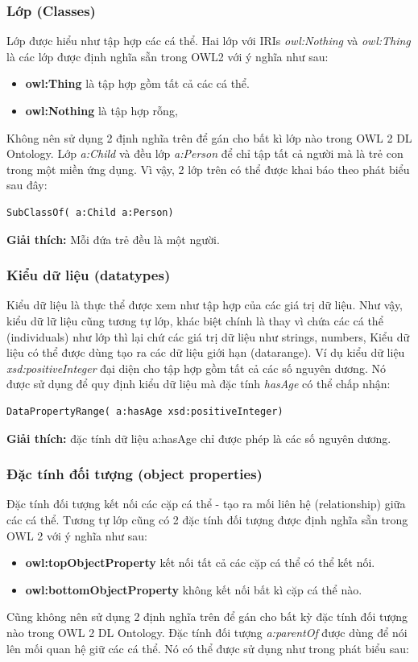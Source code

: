 \subsubsection{Lớp (Classes)}
Lớp được hiểu như tập hợp các cá thể. Hai lớp với IRIs \textit{owl:Nothing} và \textit{owl:Thing} là các lớp được định nghĩa sẵn trong OWL2 với ý nghĩa như sau:
\begin{itemize}
\item \textbf{owl:Thing} là tập hợp gồm tất cả các cá thể.
\item \textbf{owl:Nothing} là tập hợp rỗng,
\end{itemize}
Không nên sử dụng 2 định nghĩa trên để gán cho bất kì lớp nào trong OWL 2 DL Ontology. Lớp \textit{a:Child} và đều lớp \textit{a:Person} để chỉ tập tất cả người mà là trẻ con trong một miền ứng dụng. Vì vậy, 2 lớp trên có thể được khai báo theo phát biểu sau đây:

\begin{verbatim}
SubClassOf( a:Child a:Person) 
\end{verbatim}

\textbf{Giải thích:} Mỗi đứa trẻ đều là một người.

\subsubsection{Kiểu dữ liệu (datatypes)}
Kiểu dữ liệu là thực thể được xem như tập hợp của các giá trị dữ liệu. Như vậy, kiểu dữ lữ liệu cũng tương tự lớp, khác biệt chính là thay vì chứa các cá thể (individuals) như lớp thì lại chứ các giá trị dữ liệu như strings, numbers, Kiểu dữ liệu có thể được dùng tạo ra các dữ liệu giới hạn (datarange). Ví dụ kiểu dữ liệu \textit{xsd:positiveInteger} đại diện cho tập hợp gồm tất cả các số nguyên dương. Nó được sử dụng để quy định kiểu dữ liệu mà đặc tính \textit{hasAge} có thể chấp nhận:

\begin{verbatim}
DataPropertyRange( a:hasAge xsd:positiveInteger) 
\end{verbatim}

\textbf{Giải thích:} đặc tính dữ liệu a:hasAge chỉ được phép là các số nguyên dương.

\subsubsection{Đặc tính đối tượng (object properties)} 
Đặc tính đối tượng kết nối các cặp cá thể - tạo ra mối liên hệ (relationship) giữa các cá thể. Tương tự lớp cũng có 2 đặc tính đối tượng được định nghĩa sẵn trong OWL 2 với ý nghĩa như sau:
\begin{itemize}
\item \textbf{owl:topObjectProperty} kết nối tất cả các cặp cá thể có thể kết nối.
\item \textbf{owl:bottomObjectProperty} không kết nối bất kì cặp cá thể nào. 
\end{itemize}
Cũng không nên sử dụng 2 định nghĩa trên để gán cho bất kỳ đặc tính đối tượng nào trong OWL 2 DL Ontology. Đặc tính đối tượng \textit{a:parentOf} được dùng để nói lên mối quan hệ giữ các cá thể. Nó có thể được sử dụng như trong phát biểu sau:

